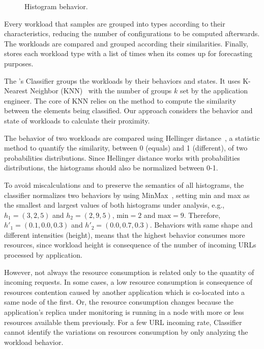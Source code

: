 \begin{figure*}[htp]
  \centering
  \def\svcwidth{\textwidth}
  \scalebox{1.0}{}
  \caption{Histogram behavior.}
  \label{fig:histogram}
\end{figure*}

Every workload that \name samples are grouped into types according to their
characteristics, reducing the number of configurations to be computed
afterwards. The workloads are compared and grouped according their similarities.
Finally, \name stores each workload type with a list of times when its comes up
for forecasting purposes.

The \name's Classifier groups the workloads by their behaviors and states. It
uses K-Nearest Neighbor (KNN)~\cite{?} with the number of groups $k$ set by the
application engineer. The core of KNN relies on the method to compute the
similarity between the elements being classified. Our approach considers the
behavior and state of workloads to calculate their proximity.


The behavior of two workloads are compared using Hellinger distance~\cite{?}, a
statistic method to quantify the similarity, between 0 (equals) and 1
(different), of two probabilities distributions. Since Hellinger distance works
with probabilities distributions, the histograms should also be normalized
between 0-1.

To avoid miscalculations and to preserve the semantics of all histograms, the
classifier normalizes two behaviors by using MinMax~\cite{?}, setting min and
max as the smallest and largest values of both histograms under analysis, e.g.,
$h_1 = (3, 2, 5)$ and $h_2 = (2, 9, 5)$, $\text{min} = 2$ and $\text{max} = 9$.
Therefore, $h'_1 = (0.1, 0.0, 0.3)$ and $h'_2 = (0.0, 0.7, 0.3)$. Behaviors with
same shape and different intensities (height), means that the highest behavior
consumes more resources, since workload height is consequence of the number of
incoming URLs processed by application.

However, not always the resource consumption is related only to the quantity of
incoming requests. In some cases, a low resource consumption is consequence of
resources contention caused by another application which is co-located into a
same node of the first. Or, the resource consumption changes because the
application's replica under monitoring is running in a node with more or less
resources available them previously. For a few URL incoming rate, Classifier
cannot identify the variations on resources consumption by only analyzing the
workload behavior.

